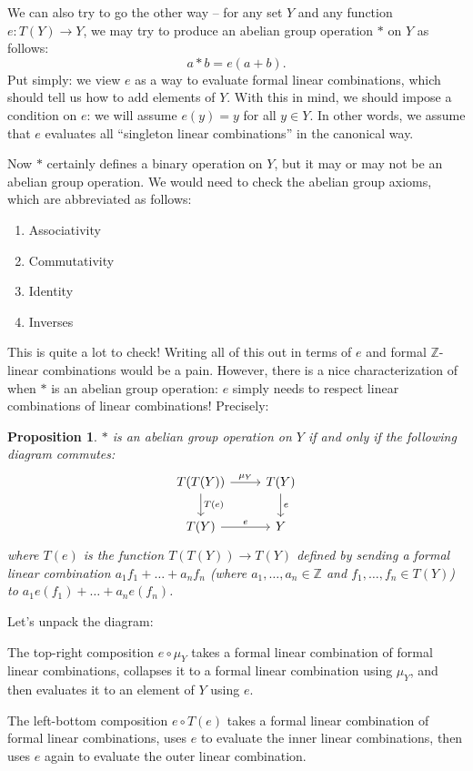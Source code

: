 \documentclass{article}
\newtheorem{prop}{Proposition}
\theoremstyle{definition}
\begin{document}
We can also try to go the other way -- for any set $Y$ and any function $e : T(Y) \to Y$, we may try to produce an abelian group operation $*$ on $Y$ as follows:
\[a * b = e(a + b).\]
Put simply: we view $e$ as a way to evaluate formal linear combinations, which should tell us how to add elements of $Y$. With this in mind, we should impose a condition on $e$: we will assume $e(y) = y$ for all $y \in Y$. In other words, we assume that $e$ evaluates all ``singleton linear combinations'' in the canonical way.

Now $*$ certainly defines a binary operation on $Y$, but it may or may not be an abelian group operation. We would need to check the abelian group axioms, which are abbreviated as follows:
\begin{enumerate}
    \item Associativity
    \item Commutativity
    \item Identity
    \item Inverses
\end{enumerate}
This is quite a lot to check! Writing all of this out in terms of $e$ and formal $\mathbb{Z}$-linear combinations would be a pain. However, there is a nice characterization of when $*$ is an abelian group operation: $e$ simply needs to respect linear combinations of linear combinations! Precisely:

\begin{prop}
$*$ is an abelian group operation on $Y$ if and only if the following diagram commutes:
\[\begin{tikzcd}
T(T(Y)) \rar["\mu_Y"] \dar["T(e)"] & T(Y) \dar["e"] \\
T(Y) \rar["e"] & Y
\end{tikzcd}\]
where $T(e)$ is the function $T(T(Y)) \to T(Y)$ defined by sending a formal linear combination $a_1 f_1 + \dots + a_n f_n$ (where $a_1, \dots, a_n \in \mathbb{Z}$ and $f_1, \dots, f_n \in T(Y)$) to $a_1 e(f_1) + \dots + a_n e(f_n)$.
\end{prop}

Let's unpack the diagram:

The top-right composition $e \circ \mu_Y$ takes a formal linear combination of formal linear combinations, collapses it to a formal linear combination using $\mu_Y$, and then evaluates it to an element of $Y$ using $e$.

The left-bottom composition $e \circ T(e)$ takes a formal linear combination of formal linear combinations, uses $e$ to evaluate the inner linear combinations, then uses $e$ again to evaluate the outer linear combination.
\end{document}
